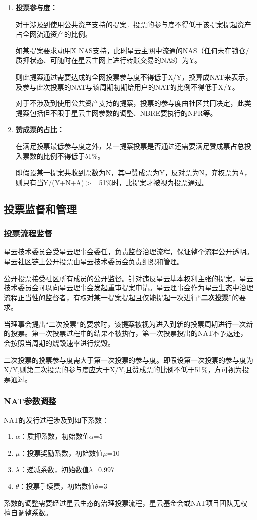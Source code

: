 \begin{enumerate}
	\item 

	\textbf{投票参与度：}

	对于涉及到使用公共资产支持的提案，投票的参与度不得低于该提案提起资产占全网流通资产的比例。

	如某提案要求动用X NAS支持，此时星云主网中流通的NAS（任何未在锁仓/质押状态、可随时在星云主网上进行转账交易的NAS）为Y。

	则此提案通过需要达成的全网投票参与度不得低于X/Y，换算成NAT来表示，及参与此次投票的NAT与该周期初期给用户的NAT的比例不得低于X/Y。

	对于不涉及到使用公共资产支持的提案，投票的参与度由社区共同决定，此类提案包括但不限于星云主网参数的调整、NBRE要执行的NPR等。

	\item

	\textbf{赞成票的占比：}

	在满足投票最低参与度之外，某一提案投票是否通过还需要满足赞成票占总投入票数的比例不得低于51\%。

	即假设某一提案共收到票数为N，其中赞成票为Y，反对票为N，弃权票为A，则只有当Y/(Y+N+A) >= 51\%时，此提案才被视为投票通过。
\end{enumerate}

\subsection{投票监督和管理}

\subsubsection{投票流程监督}
\label{second-vote}

星云技术委员会受星云理事会委任，负责监督治理流程，保证整个流程公开透明。星云社区链上公开投票由星云技术委员会负责组织和管理。

公开投票接受社区所有成员的公开监督。针对违反星云基本权利主张的提案，星云技术委员会可以向星云理事会发起重审提案申请。星云理事会作为星云生态中治理流程正当性的监督者，有权对某一提案提起且仅能提起一次进行“\textbf{二次投票}”的要求。

当理事会提出“二次投票”的要求时，该提案被视为进入到新的投票周期进行一次新的投票。第一次投票过程中的结果不被执行，第一次投票投出的NAT不予返还，会按照当周期的烧毁速率进行烧毁。

二次投票的投票参与度需大于第一次投票的参与度。即假设第一次投票的参与度为X/Y,则第二次投票的参与度应大于X/Y,且赞成票的比例不低于51\%，方可视为投票通过。

\subsubsection{NAT参数调整}

NAT的发行过程涉及到如下系数：

\begin{enumerate}
	\item $\alpha$：质押系数，初始数值$\alpha$=5
	\item $\mu$：投票奖励系数，初始数值$\mu$=10
	\item $\lambda$：递减系数，初始数值$\lambda$=0.997
	\item $\theta$：投票手续费，初始数值$\theta$=3
\end{enumerate}

系数的调整需要经过星云生态的治理投票流程，星云基金会或NAT项目团队无权擅自调整系数。




